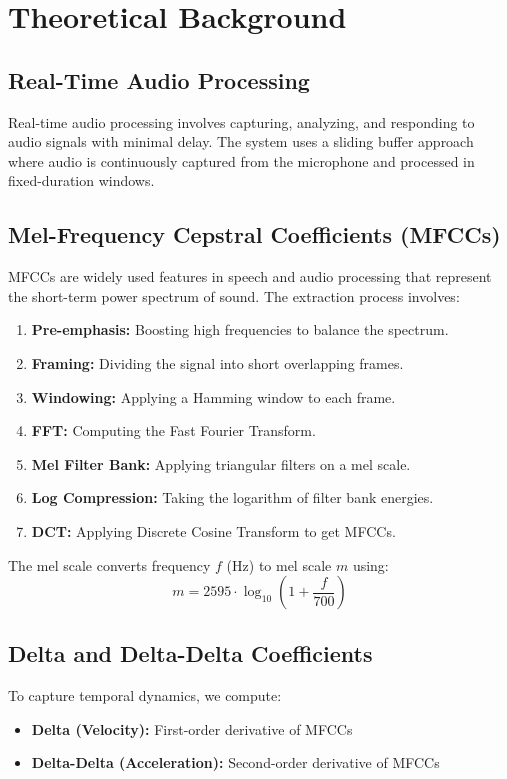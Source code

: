 \documentclass[a4paper,12pt]{article}
\begin{document}
\section{Theoretical Background}

\subsection{Real-Time Audio Processing}
Real-time audio processing involves capturing, analyzing, and responding to audio signals with minimal delay. The system uses a sliding buffer approach where audio is continuously captured from the microphone and processed in fixed-duration windows.

\subsection{Mel-Frequency Cepstral Coefficients (MFCCs)}
MFCCs are widely used features in speech and audio processing that represent the short-term power spectrum of sound. The extraction process involves:

\begin{enumerate}
    \item \textbf{Pre-emphasis:} Boosting high frequencies to balance the spectrum.
    \item \textbf{Framing:} Dividing the signal into short overlapping frames.
    \item \textbf{Windowing:} Applying a Hamming window to each frame.
    \item \textbf{FFT:} Computing the Fast Fourier Transform.
    \item \textbf{Mel Filter Bank:} Applying triangular filters on a mel scale.
    \item \textbf{Log Compression:} Taking the logarithm of filter bank energies.
    \item \textbf{DCT:} Applying Discrete Cosine Transform to get MFCCs.
\end{enumerate}

The mel scale converts frequency $f$ (Hz) to mel scale $m$ using:
\begin{equation}
    m = 2595 \cdot \log_{10}\left(1 + \frac{f}{700}\right)
\end{equation}

\subsection{Delta and Delta-Delta Coefficients}
To capture temporal dynamics, we compute:
\begin{itemize}
    \item \textbf{Delta (Velocity):} First-order derivative of MFCCs
    \item \textbf{Delta-Delta (Acceleration):} Second-order derivative of MFCCs
\end{itemize}
\end{document}
